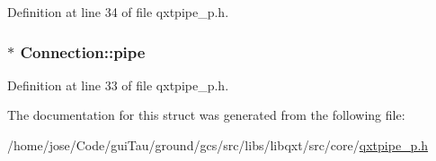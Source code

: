 Definition at line 34 of file qxtpipe\-\_\-p.\-h.

\hypertarget{struct_connection_ab227c6e0789a3c0a569f0a8912ef0364}{
\subsubsection[{pipe}]{$\ast$ Connection\-::pipe}}\label{struct_connection_ab227c6e0789a3c0a569f0a8912ef0364}


Definition at line 33 of file qxtpipe\-\_\-p.\-h.



The documentation for this struct was generated from the following file\-:\begin{DoxyCompactItemize}
\item 
/home/jose/\-Code/gui\-Tau/ground/gcs/src/libs/libqxt/src/core/\hyperlink{qxtpipe__p_8h}{qxtpipe\-\_\-p.\-h}\end{DoxyCompactItemize}

